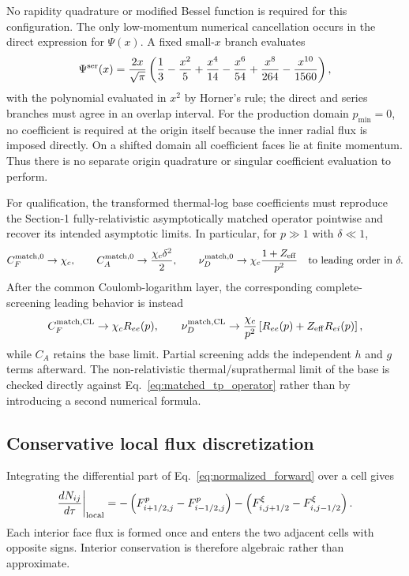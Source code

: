 \documentclass[11pt]{article}
\begin{document}
No rapidity quadrature or modified Bessel function is required for this configuration.
The only low-momentum numerical cancellation occurs in the direct expression for
$\Psi(x)$.  A fixed small-$x$ branch evaluates
\begin{equation}
 \Psi^{\rm ser}(x)
 =\frac{2x}{\sqrt{\pi}}
 \left(
  \frac13-\frac{x^2}{5}+\frac{x^4}{14}-\frac{x^6}{54}
  +\frac{x^8}{264}-\frac{x^{10}}{1560}
 \right),
 \label{eq:matched_psi_smallx}
\end{equation}
with the polynomial evaluated in $x^2$ by Horner's rule; the direct and series branches
must agree in an overlap interval.  For the production domain $p_{\min}=0$, no coefficient is required at the origin itself
because the inner radial flux is imposed directly.  On a shifted domain all coefficient
faces lie at finite momentum.  Thus there is no separate origin quadrature or singular
coefficient evaluation to perform.

For qualification, the transformed thermal-log base coefficients must reproduce the
Section-1 fully-relativistic asymptotically matched operator pointwise and recover its
intended asymptotic limits.  In particular, for $p\gg1$ with $\delta\ll1$,
\begin{equation}
 C_F^{\rm match,0}\rightarrow\chi_c,\qquad
 C_A^{\rm match,0}\rightarrow\frac{\chi_c\delta^2}{2},\qquad
 \nu_D^{\rm match,0}\rightarrow
 \chi_c\frac{1+Z_{\rm eff}}{p^2}
 \quad\text{to leading order in }\delta.
 \label{eq:matched_relativistic_limits}
\end{equation}
After the common Coulomb-logarithm layer, the corresponding complete-screening leading
behavior is instead
\begin{equation}
 C_F^{\rm match,CL}\rightarrow\chi_c R_{ee}(p),\qquad
 \nu_D^{\rm match,CL}\rightarrow
 \frac{\chi_c}{p^2}\left[R_{ee}(p)+Z_{\rm eff}R_{ei}(p)\right],
 \label{eq:matched_relativistic_limits_logs}
\end{equation}
while $C_A$ retains the base limit.  Partial screening adds the independent $h$ and $g$
terms afterward.  The non-relativistic thermal/suprathermal limit of the base is checked
directly against Eq.~\eqref{eq:matched_tp_operator} rather than by introducing a second
numerical formula.

\subsection{Conservative local flux discretization}

Integrating the differential part of Eq.~\eqref{eq:normalized_forward} over a cell gives
\begin{equation}
 \frac{dN_{ij}}{d\tau}\bigg|_{\rm local}
 =-\left(F^p_{i+1/2,j}-F^p_{i-1/2,j}\right)
  -\left(F^\xi_{i,j+1/2}-F^\xi_{i,j-1/2}\right).
 \label{eq:fv_balance}
\end{equation}
Each interior face flux is formed once and enters the two adjacent cells with opposite
signs.  Interior conservation is therefore algebraic rather than approximate.
\end{document}
